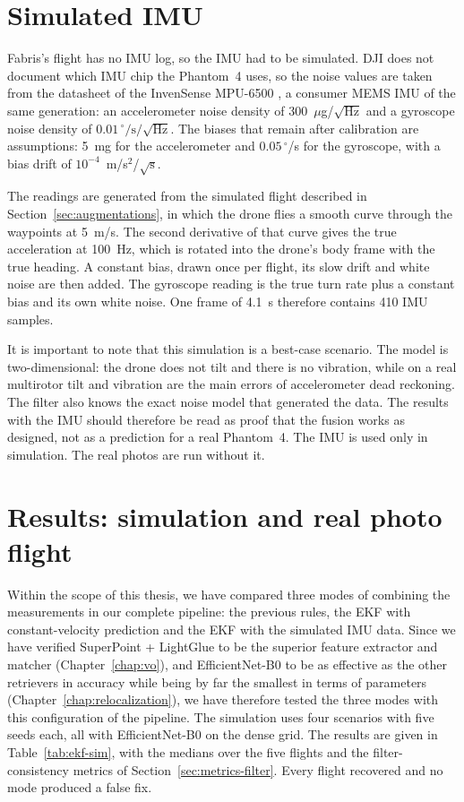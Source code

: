 \documentclass[english, Lau, oneside]{sapthesis}%
\begin{document}
\section{Simulated IMU}
\label{sec:ekf-imu}
Fabris's flight has no IMU log, so the IMU had to be simulated. DJI does not document which IMU chip the Phantom~4 uses, so the noise values are taken from the datasheet of the InvenSense MPU-6500 \citep{invensense2015mpu6500}, a consumer MEMS IMU of the same generation: an accelerometer noise density of 300~$\mu$g/$\sqrt{\mathrm{Hz}}$ and a gyroscope noise density of $0.01\,^{\circ}/\mathrm{s}/\sqrt{\mathrm{Hz}}$. The biases that remain after calibration are assumptions: 5~mg for the accelerometer and $0.05\,^{\circ}$/s for the gyroscope, with a bias drift of $10^{-4}$~m/s$^2$/$\sqrt{\mathrm{s}}$.

The readings are generated from the simulated flight described in Section~\ref{sec:augmentations}, in which the drone flies a smooth curve through the waypoints at 5~m/s. The second derivative of that curve gives the true acceleration at 100~Hz, which is rotated into the drone's body frame with the true heading. A constant bias, drawn once per flight, its slow drift and white noise are then added. The gyroscope reading is the true turn rate plus a constant bias and its own white noise. One frame of 4.1~s therefore contains 410 IMU samples.

It is important to note that this simulation is a best-case scenario. The model is two-dimensional: the drone does not tilt and there is no vibration, while on a real multirotor tilt and vibration are the main errors of accelerometer dead reckoning. The filter also knows the exact noise model that generated the data. The results with the IMU should therefore be read as proof that the fusion works as designed, not as a prediction for a real Phantom~4. The IMU is used only in simulation. The real photos are run without it.

\section{Results: simulation and real photo flight}
\label{sec:ekf-results}
Within the scope of this thesis, we have compared three modes of combining the measurements in our complete pipeline: the previous rules, the EKF with constant-velocity prediction and the EKF with the simulated IMU data. Since we have verified SuperPoint + LightGlue to be the superior feature extractor and matcher (Chapter~\ref{chap:vo}), and EfficientNet-B0 to be as effective as the other retrievers in accuracy while being by far the smallest in terms of parameters (Chapter~\ref{chap:relocalization}), we have therefore tested the three modes with this configuration of the pipeline. The simulation uses four scenarios with five seeds each, all with EfficientNet-B0 on the dense grid. The results are given in Table~\ref{tab:ekf-sim}, with the medians over the five flights and the filter-consistency metrics of Section~\ref{sec:metrics-filter}. Every flight recovered and no mode produced a false fix.
\end{document}
